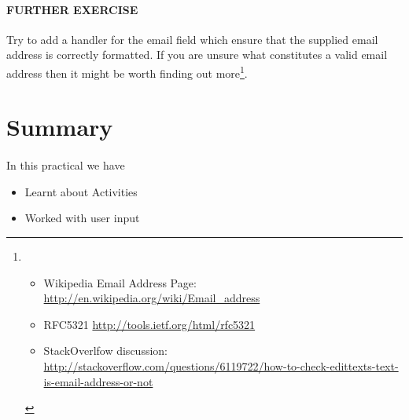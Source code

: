 \paragraph{FURTHER EXERCISE} Try to add a handler for the email field which ensure that the supplied email address is correctly formatted. If you are unsure what constitutes a valid email address then it might be worth finding out more\footnote{\begin{itemize}\item Wikipedia Email Address Page: \url{http://en.wikipedia.org/wiki/Email_address} \item RFC5321 \url{http://tools.ietf.org/html/rfc5321} \item StackOverlfow discussion: \url{http://stackoverflow.com/questions/6119722/how-to-check-edittexts-text-is-email-address-or-not}\end{itemize}}.


\section{Summary}
\paragraph{} In this practical we have 

\begin{itemize}
\item Learnt about Activities
\item Worked with user input
\end{itemize}

